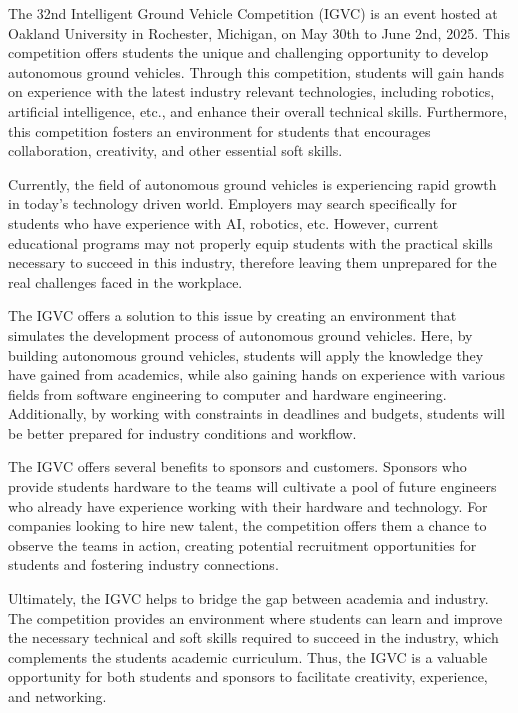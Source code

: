 The 32nd Intelligent Ground Vehicle Competition (IGVC) is an event hosted at Oakland University in Rochester, Michigan, on May 30th to June 2nd, 2025. This competition offers students the unique and challenging opportunity to develop autonomous ground vehicles. Through this competition, students will gain hands on experience with the latest industry relevant technologies, including robotics, artificial intelligence, etc., and enhance their overall technical skills. Furthermore, this competition fosters an environment for students that encourages collaboration, creativity, and other essential soft skills.

Currently, the field of autonomous ground vehicles is experiencing rapid growth in today's technology driven world.
Employers may search specifically for students who have experience with AI, robotics, etc. However, current educational programs may not properly equip students with the practical skills necessary to succeed in this industry, therefore leaving them unprepared for the real challenges faced in the workplace.

The IGVC offers a solution to this issue by creating an environment that simulates the development process of autonomous ground vehicles. Here, by building autonomous ground vehicles, students will apply the knowledge they have gained from academics, while also gaining hands on experience with various fields from software engineering to computer and hardware engineering. Additionally, by working with constraints in deadlines and budgets, students will be better prepared for industry conditions and workflow.

The IGVC offers several benefits to sponsors and customers. Sponsors who provide students hardware to the teams will cultivate a pool of future engineers who already have experience working with their hardware and technology. For companies looking to hire new talent, the competition offers them a chance to observe the teams in action, creating potential recruitment opportunities for students and fostering industry connections.

Ultimately, the IGVC helps to bridge the gap between academia and industry. The competition provides an environment where students can learn and improve the necessary technical and soft skills required to succeed in the industry, which complements the students academic curriculum. Thus, the IGVC is a valuable opportunity for both students and sponsors to facilitate creativity, experience, and networking.